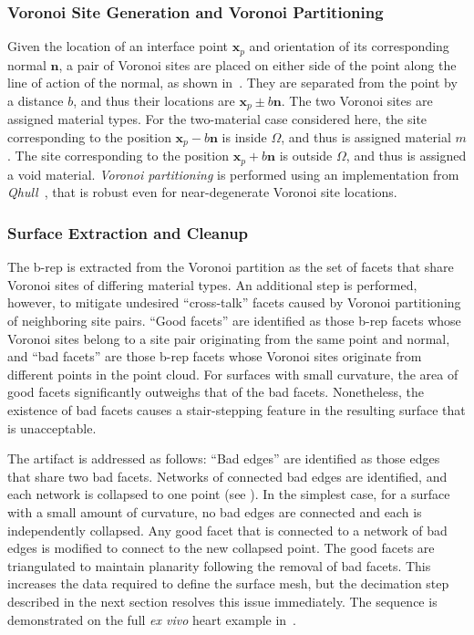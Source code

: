 \subsubsection{Voronoi Site Generation and Voronoi Partitioning}

Given the location of an interface point $\bm{x}_p$ and orientation of its corresponding normal $\bm{n}$, a pair of Voronoi sites are placed on either side of the point along the line of action of the normal, as shown in~. They are separated from the point by a distance $b$, and thus their locations are $\bm{x}_p \pm b \bm{n}$. The two Voronoi sites are assigned material types. For the two-material case considered here, the site corresponding to the position $\bm{x}_p - b\bm{n}$ is inside $\Omega$, and thus is assigned material $m$. The site corresponding to the position $\bm{x}_p + b\bm{n}$ is outside $\Omega$, and thus is assigned a void material. \textit{Voronoi partitioning} is performed using an implementation from \textit{Qhull}~\cite{barber_1996}, that is robust even for near-degenerate Voronoi site locations.

\subsubsection{Surface Extraction and Cleanup}

The b-rep is extracted from the Voronoi partition as the set of facets that share Voronoi sites of differing material types. An additional step is performed, however, to mitigate undesired ``cross-talk'' facets caused by Voronoi partitioning of neighboring site pairs. ``Good facets'' are identified as those b-rep facets whose Voronoi sites belong to a site pair originating from the same point and normal, and ``bad facets'' are those b-rep facets whose Voronoi sites originate from different points in the point cloud. For surfaces with small curvature, the area of good facets significantly outweighs that of the bad facets. Nonetheless, the existence of bad facets causes a stair-stepping feature in the resulting surface that is unacceptable.

The artifact is addressed as follows: ``Bad edges'' are identified as those edges that share two bad facets. Networks of connected bad edges are identified, and each network is collapsed to one point (see ). In the simplest case, for a surface with a small amount of curvature, no bad edges are connected and each is independently collapsed. Any good facet that is connected to a network of bad edges is modified to connect to the new collapsed point. The good facets are triangulated to maintain planarity following the removal of bad facets. This increases the data required to define the surface mesh, but the decimation step described in the next section resolves this issue immediately. The sequence is demonstrated on the full \textit{ex vivo} heart example in~.

